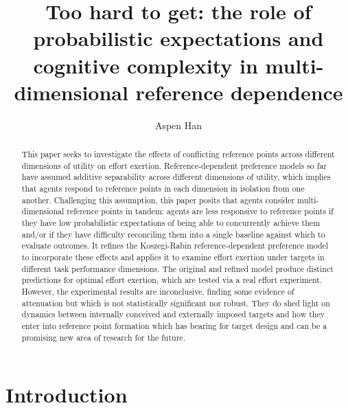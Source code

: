 \documentclass[
  12,
  letterpaper,
  DIV=11,
  numbers=noendperiod]{scrartcl}
\title{Too hard to get: the role of probabilistic expectations and
cognitive complexity in multi-dimensional reference dependence}
\author{Aspen Han}
\date{}
\begin{document}
\maketitle
\begin{abstract}
This paper seeks to investigate the effects of conflicting reference
points across different dimensions of utility on effort exertion.
Reference-dependent preference models so far have assumed additive
separability across different dimensions of utility, which implies that
agents respond to reference points in each dimension in isolation from
one another. Challenging this assumption, this paper posits that agents
consider multi-dimensional reference points in tandem: agents are less
responsive to reference points if they have low probabilistic
expectations of being able to concurrently achieve them and/or if they
have difficulty reconciling them into a single baseline against which to
evaluate outcomes. It refines the Koszegi-Rabin reference-dependent
preference model to incorporate these effects and applies it to examine
effort exertion under targets in different task performance dimensions.
The original and refined model produce distinct predictions for optimal
effort exertion, which are tested via a real effort experiment. However,
the experimental results are inconclusive, finding some evidence of
attenuation but which is not statistically significant nor robust. They
do shed light on dynamics between internally conceived and externally
imposed targets and how they enter into reference point formation which
has bearing for target design and can be a promising new area of
research for the future.
\end{abstract}


\section{Introduction}\label{introduction}
\end{document}
